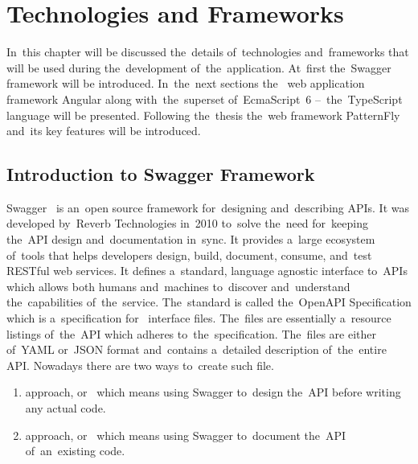 \chapter{Technologies and Frameworks}
\label{Technologies}
In~this chapter will be discussed the~details of~technologies and~frameworks
that will be used during the~development of~the~application. At~first
the~Swagger framework will be introduced. In~the~next sections
the~ web application framework Angular along with~the~superset
of~EcmaScript~6 --~the~TypeScript language will be presented. Following
the~thesis the~web framework PatternFly and~its key features will be introduced.


\section{Introduction to Swagger Framework}
Swagger~\cite{Swagger} is an~open source framework for~designing and~describing
APIs. It was developed by~Reverb Technologies in~2010 to~solve the~need
for~keeping the~API design and~documentation in~sync. It provides a~large
ecosystem of~tools that helps developers design, build, document, consume,
and~test RESTful web services. It defines a~standard, language agnostic
interface to~APIs which allows both humans and~machines to~discover
and~understand the~capabilities of~the~service. The~standard is called
the~OpenAPI Specification which is a~specification for~
interface files. The~files are essentially a~resource listings of~the~API which
adheres to~the~specification. The~files are either of~YAML or~JSON format
and~contains a~detailed description of~the~entire API. Nowadays there are two
ways to~create such file.

\begin{enumerate}
  \item {} approach, or~ which means using Swagger
  to~design the~API before writing any actual code.
  \item {} approach, or~ which means using Swagger
  to~document the~API of~an~existing code.
\end{enumerate}


